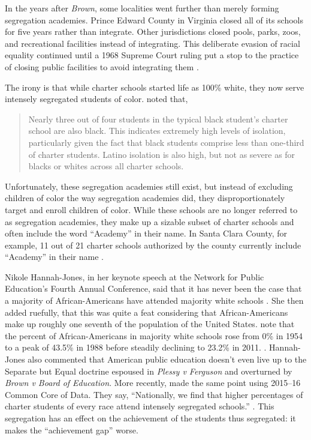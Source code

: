 In the years after \textit{Brown}, some localities went further than merely forming segregation academies. Prince Edward County in Virginia closed all of its schools for five years rather than integrate. Other jurisdictions closed pools, parks, zoos, and recreational facilities instead of integrating. This deliberate evasion of racial equality continued until a 1968 Supreme Court ruling put a stop to the practice of closing public facilities to avoid integrating them  \parencite{Brennan1968}.

The irony is that while charter schools started life as 100\% white, they now serve intensely segregated students of color. \textcite{Frankenberg.etal2019} noted that,

\begin{quote}\OnehalfSpacing%
Nearly three out of four students in the typical black student's charter school are also black. This indicates extremely high levels of isolation, particularly given the fact that black students comprise less than one-third of charter students. Latino isolation is also high, but not as severe as for blacks or whites across all charter schools. 
\end{quote}

Unfortunately, these segregation academies still exist, but instead of excluding children of color the way segregation academies did, they disproportionately target and enroll children of color. While these schools are no longer referred to as segregation academies, they make up a sizable subset of charter schools and often include the word ``Academy'' in their name. In Santa Clara County, for example, 11 out of 21 charter schools authorized by the county currently include ``Academy'' in their name \parencite{SCCOE2021}.

Nikole Hannah-Jones, in her keynote speech at the Network for Public Education's Fourth Annual Conference, said that it has never been the case that a majority of African-Americans have attended majority white schools \parencite{Hannah-Jones2017}. She then added ruefully, that this was quite a feat considering that African-Americans make up roughly one seventh of the population of the United States. \citeauthor{Orfield.Frankenberg2014} note that the percent of African-Americans in majority white schools rose from 0\% in 1954 to a peak of 43.5\% in 1988 before steadily declining to 23.2\% in 2011. \parencite[Table 3: Percent of Black Students in Majority White Schools, 1954–2011,][10]{Orfield.Frankenberg2014}. Hannah-Jones also commented that American public education doesn't even live up to the Separate but Equal doctrine espoused in \textit{Plessy v Ferguson} and overturned by \textit{Brown v Board of Education}. More recently, \citeauthor{Heilig.etal2019a} made the same point using 2015--16 Common Core of Data. They say, ``Nationally, we find that higher percentages of charter students of every race attend intensely segregated schools.'' \parencite[205]{Heilig.etal2019a}. This segregation has an effect on the achievement of the students thus segregated: it makes the ``achievement gap'' worse.


